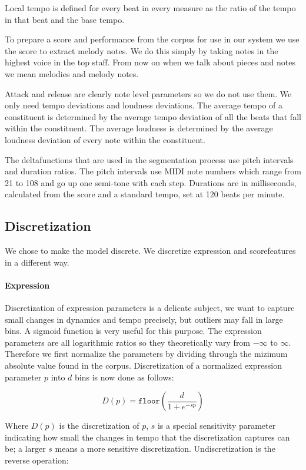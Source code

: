 \documentclass[a4paper,10pt]{article}
\begin{document}
Local tempo is defined for every beat in every measure as the ratio of the tempo in that beat and the base tempo. 

To prepare a score and performance from the corpus for use in our system we use the score to extract melody notes. We do this simply by taking notes in the highest voice in the top staff. From now on when we talk about pieces and notes we mean melodies and melody notes.

Attack and release are clearly note level parameters so we do not use them. We only need tempo deviations and loudness deviations. The average tempo of a constituent is determined by the average tempo deviation of all the beats that fall within the constituent. The average loudness is determined by the average loudness deviation of every note within the constituent.

The deltafunctions that are used in the segmentation process use pitch intervals and duration ratios. The pitch intervals use MIDI note numbers which range from 21 to 108 and go up one semi-tone with each step. Durations are in milliseconds, calculated from the score and a standard tempo, set at 120 beats per minute.

\subsection{Discretization}
\label{sec:discretization}

We chose to make the model discrete. We discretize expression and scorefeatures in a different way.

\paragraph*{Expression} Discretization of expression parameters is a delicate subject, we want to capture small changes in dynamics and tempo precisely, but outliers may fall in large bins. A sigmoid function is very useful for this purpose. The expression parameters are all logarithmic ratios so they theoretically vary from $-\infty$ to $\infty$. Therefore we first normalize the parameters by dividing through the mizimum absolute value found in the corpus. Discretization of a normalized expression parameter $p$ into $d$ bins is now done as follows:

\begin{equation}
D(p) = \texttt{floor}\left(\frac{d}{1+e^{-sp}}\right)
\end{equation}

Where $D(p)$ is the discretization of $p$, $s$ is a special sensitivity parameter indicating how small the changes in tempo that the discretization captures can be; a larger $s$ means a more sensitive discretization. Undiscretization is the reverse operation:
\end{document}
